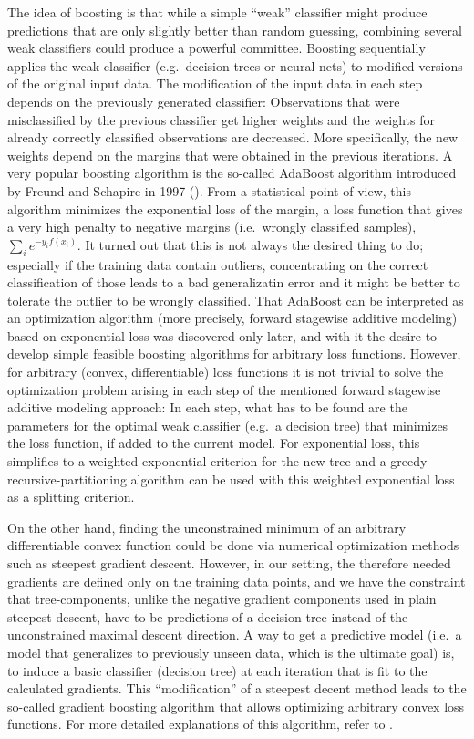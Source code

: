 The idea of boosting is that while a simple ``weak'' classifier might produce predictions that are only slightly better than random guessing, combining several weak classifiers could produce a powerful committee. 
Boosting sequentially applies the weak classifier (e.g.\ decision trees or neural nets) to modified versions of the original input data. 
The modification of the input data in each step depends on the previously generated classifier: Observations that were misclassified by the previous classifier get higher weights and the weights for already correctly classified observations are decreased. More specifically, the new weights depend on the margins that were obtained in the previous iterations. 
A very popular boosting algorithm is the so-called AdaBoost algorithm introduced by Freund and Schapire in 1997 (\cite{freund1997decision}). 
From a statistical point of view, this algorithm minimizes the exponential loss of the margin, a loss function that gives a very high penalty to negative margins (i.e.\ wrongly classified samples),$\sum_i e^{-y_i f(x_i)}$. 
It turned out that this is not always the desired thing to do; especially if the training data contain outliers, concentrating on the correct classification of those leads to a bad generalizatin error and it might be better to tolerate the outlier to be wrongly classified. 
That AdaBoost can be interpreted as an optimization algorithm (more precisely, forward stagewise additive modeling) based on exponential loss was discovered only later, and with it the desire to develop simple feasible boosting algorithms for arbitrary loss functions. 
However, for arbitrary (convex, differentiable) loss functions it is not trivial to solve the optimization problem arising in each step of the mentioned forward stagewise additive modeling approach: 
In each step, what has to be found are the parameters for the optimal weak classifier (e.g.\ a decision tree) that minimizes the loss function, if added to the current model. 
For exponential loss, this simplifies to a weighted exponential criterion for the new tree and a greedy recursive-partitioning algorithm can be used with this weighted exponential loss as a splitting criterion. 

On the other hand, finding the unconstrained minimum of an arbitrary differentiable convex function could be done via numerical optimization methods such as steepest gradient descent. 
However, in our setting, the therefore needed gradients are defined only on the training data points, and we have the constraint that tree-components, unlike the negative gradient components used in plain steepest descent, have to be predictions of a decision tree instead of the unconstrained maximal descent direction. 
A way to get a predictive model (i.e.\ a model that generalizes to previously unseen data, which is the ultimate goal) is, to induce a basic classifier (decision tree) at each iteration that is fit to the calculated gradients. This ``modification'' of a steepest decent method leads to the so-called gradient boosting algorithm that allows optimizing arbitrary convex loss functions.
For more detailed explanations of this algorithm, refer to \cite[Chapter~10]{friedman2009elements}.

